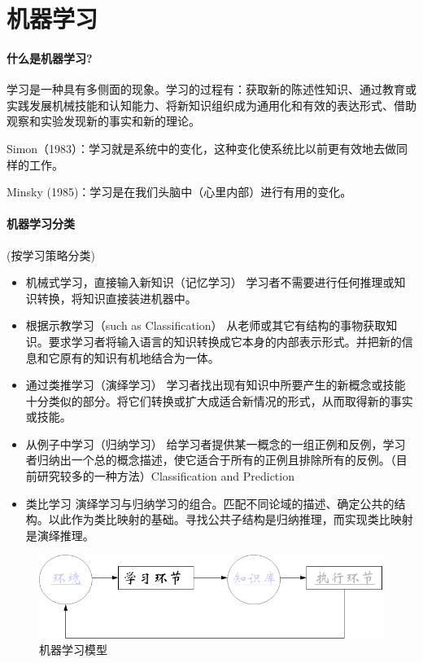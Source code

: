 \documentclass[UTF8,a4paper]{ctexart}
\begin{document}
\section{机器学习}
\paragraph{什么是机器学习?}
学习是一种具有多侧面的现象。学习的过程有：获取新的陈述性知识、通过教育或实践发展机械技能和认知能力、将新知识组织成为通用化和有效的表达形式、借助观察和实验发现新的事实和新的理论。

Simon（1983）：学习就是系统中的变化，这种变化使系统比以前更有效地去做同样的工作。

Minsky (1985)：学习是在我们头脑中（心里内部）进行有用的变化。

\paragraph{机器学习分类}(按学习策略分类)
\begin{itemize}
	\item 机械式学习，直接输入新知识（记忆学习）
	      学习者不需要进行任何推理或知识转换，将知识直接装进机器中。
	\item 根据示教学习（such as Classification）
	      从老师或其它有结构的事物获取知识。要求学习者将输入语言的知识转换成它本身的内部表示形式。并把新的信息和它原有的知识有机地结合为一体。
	\item 通过类推学习（演绎学习）
	      学习者找出现有知识中所要产生的新概念或技能十分类似的部分。将它们转换或扩大成适合新情况的形式，从而取得新的事实或技能。
	\item 从例子中学习（归纳学习）
	      给学习者提供某一概念的一组正例和反例，学习者归纳出一个总的概念描述，使它适合于所有的正例且排除所有的反例。（目前研究较多的一种方法）Classification and Prediction
	\item 类比学习
	      演绎学习与归纳学习的组合。匹配不同论域的描述、确定公共的结构。以此作为类比映射的基础。寻找公共子结构是归纳推理，而实现类比映射是演绎推理。
\end{itemize}

\begin{figure}[H]
	\centering
	\includegraphics[scale = 0.3]{assets/ArtificialIntelligence/2018-01-09-00-54-20.png}
	\caption{机器学习模型}
\end{figure}
\end{document}
